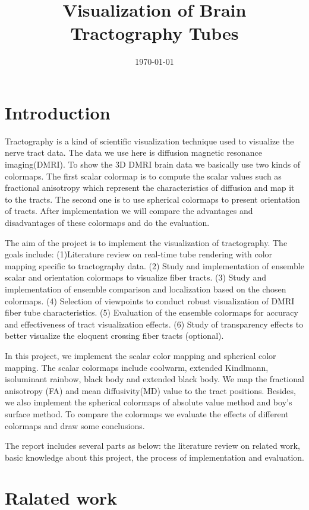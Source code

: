 \documentclass[a4paper, 12pt]{report}
\title{Visualization of Brain Tractography Tubes}
\date{\today}
\begin{document}
\maketitle
\tableofcontents
\chapter{Introduction}

Tractography is a kind of scientific visualization technique used to visualize the nerve tract data. The data we use here is diffusion magnetic resonance imaging(DMRI). To show the 3D DMRI brain data we basically use two kinds of colormaps. The first scalar colormap is to compute the scalar values such as fractional anisotropy which represent the characteristics of diffusion and map it to the tracts. The second one is to use spherical colormaps to present orientation of tracts. After implementation we will compare the advantages and disadvantages of these colormaps and do the evaluation.

The aim of the project is to implement the visualization of tractography. The goals include: (1)Literature review on real-time tube rendering with color mapping specific to tractography data. (2) Study and implementation of ensemble scalar and orientation colormaps to visualize fiber tracts. (3) Study and implementation of ensemble comparison and localization based on the chosen colormaps. (4) Selection of viewpoints to conduct robust visualization of DMRI fiber tube characteristics. (5) Evaluation of the ensemble colormaps for accuracy and effectiveness of tract visualization effects. (6) Study of transparency effects to better visualize the eloquent crossing fiber tracts (optional).

In this project, we implement the scalar color mapping and spherical color mapping. The scalar colormaps include coolwarm, extended Kindlmann, isoluminant rainbow, black body and extended black body. We map the fractional anisotropy (FA) and mean diffusivity(MD) value to the tract positions. Besides, we also implement the spherical colormaps of absolute value method and boy’s surface method. To compare the colormaps we evaluate the effects of different colormaps and draw some conclusions.

The report includes several parts as below: the literature review on related work, basic knowledge about this project, the process of implementation and evaluation.


\chapter{Ralated work}
\end{document}
